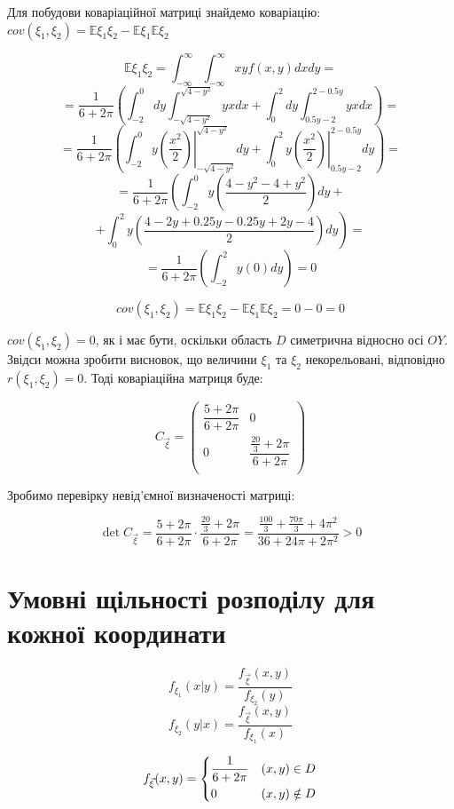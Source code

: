 \documentclass[14pt, a4paper, ukrainian]{extreport}
\begin{document}
	Для побудови коваріаційної матриці знайдемо коваріацію:\\ $cov(\xi_1, \xi_2) = \mathbb{E}\xi_1\xi_2 - \mathbb{E}\xi_1\mathbb{E}\xi_2$
 		
 	$$\mathbb{E}\xi_1\xi_2 = \int_{-\infty}^{\infty}\int_{-\infty}^{\infty}xyf(x, y)dxdy = $$
 	$$ =  \frac{1}{6+2\pi} \left(\int_{-2}^{0}dy\int_{-\sqrt{4-y^2}}^{\sqrt{4-y^2}}yxdx + \int_{0}^{2}dy\int_{0.5y-2}^{2-0.5y}yxdx\right) = 
 	$$
 	$$ = \frac{1}{6+2\pi} \left(\int_{-2}^{0}y\left.\left(\frac{x^2}{2}\right)\right|_{-\sqrt{4-y^2}}^{\sqrt{4-y^2}}dy+ \int_{0}^{2}y\left.\left(\frac{x^2}{2}\right)\right|_{0.5y-2}^{2-0.5y}dy \right)= 
 	$$
 	$$ = \frac{1}{6+2\pi} \left(\int_{-2}^{0}y\left(\frac{4-y^2 - 4 + y^2}{2}\right)dy \right.+ 
 	$$
 	$$ + \left.\int_{0}^{2}y\left(\frac{4 - 2y + 0.25y - 0.25y + 2y - 4}{2}\right)dy\right) = 
 	$$
 	$$ =\frac{1}{6+2\pi}\left(\int_{-2}^{2}y(0)dy\right) = 0$$
 	
 	$$cov(\xi_1, \xi_2) = \mathbb{E}\xi_1\xi_2 - \mathbb{E}\xi_1\mathbb{E}\xi_2 = 0 - 0 = 0$$
 		
 	$cov(\xi_1, \xi_2) = 0$, як і має бути, оскільки область $D$ симетрична відносно осі $OY$. Звідси можна зробити висновок, що величини $\xi_1$ та $\xi_2$ некорельовані, відповідно $r(\xi_1, \xi_2) = 0$. Тоді коваріаційна матриця буде:
 	
 	$$C_{\vec\xi} = \left(  
 	\begin{matrix}
 		\dfrac{5+2\pi}{6+2\pi} & 0\\
 		0 & \dfrac{\frac{20}{3} + 2\pi}{6 + 2\pi}\\
 	\end{matrix}\right)
 	$$
 	
 	Зробимо перевірку невід'ємної визначеності матриці: 
 	
 	$$\det{C_{\vec\xi}}  = \frac{5 + 2\pi}{6+2\pi} \cdot \frac{\frac{20}{3} + 2\pi}{6+2\pi} = \frac{\frac{100}{3} + \frac{70\pi}{3} + 4\pi^2}{36 + 24\pi + 2\pi^2} > 0$$
 	 	
 	\section{Умовні щільності розподілу для кожної координати}
 	
 	$$f_{\xi_1}(x|y) = \dfrac{f_{\vec \xi}(x, y)}{f_{\xi_2}(y)} $$
 	$$f_{\xi_2}(y|x) = \dfrac{f_{\vec \xi}(x, y)}{f_{\xi_1}(x)} $$
 	
 	$$f_{\vec \xi}(x, y) = 
 	\begin{dcases}
 		\frac{1}{6+2\pi} & (x, y) \in D\\
 		0 & (x, y) \notin D\\
 	\end{dcases}
 	$$
 	
\end{document}
